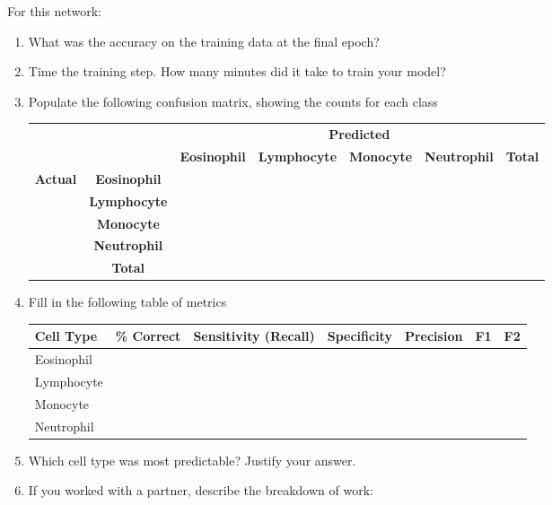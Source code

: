 \documentclass[11pt]{article}
\renewcommand\:{\colon} %
\begin{document}
\noindent For this network:
\begin{enumerate}
\item What was the accuracy on the training data at the final epoch? 

\item Time the training step. How many minutes did it take to train your model?

\item Populate the following confusion matrix, showing the counts for each class

\begin{tabular}{|l|c|c|c|c|c|c|} \hline
\multicolumn{2}{|c|}{ } &  \multicolumn{5}{|c|}{\textbf{Predicted}}  \\ \cline{3-7}
\multicolumn{2}{|c|}{ } & \textbf{Eosinophil} & \textbf{Lymphocyte} & \textbf{Monocyte} & \textbf{Neutrophil} & \textbf{Total}   \\ \hline
\multirow{ 4}{*}{\textbf{Actual}}& \textbf{Eosinophil}  & & & & & \\ \cline{2-7}
& \textbf{Lymphocyte}    & & & & & \\ \cline{2-7}
& \textbf{Monocyte}    & & & & & \\ \cline{2-7}
& \textbf{Neutrophil}   & & & & &\\ \cline{2-7}
& \textbf{Total} & & & & & \\ \hline
\end{tabular}

\item Fill in the following table of metrics


\begin{tabular}{|l|c|c|c|c|c|c|} \hline
\textbf{Cell Type} & \textbf{\% Correct} & \textbf{Sensitivity (Recall)} & \textbf{Specificity} & \textbf{Precision} & \textbf{F1} & \textbf{F2} \\ \hline
Eosinophil & & & & & & \\ \hline
Lymphocyte &  & & & & & \\ \hline
Monocyte &  & & & & & \\ \hline
Neutrophil & & & & & & \\ \hline
\end{tabular}
\item Which cell type was most predictable? Justify your answer.


\item If you worked with a partner, describe the breakdown of work:

\end{enumerate}
\end{document}
